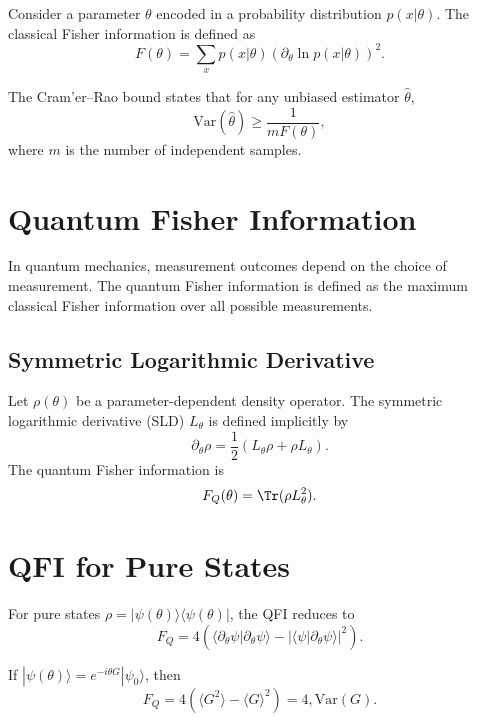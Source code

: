 \documentclass{book}
\begin{document}
Consider a parameter $\theta$ encoded in a probability distribution $p(x|\theta)$. The classical Fisher information is defined as
\begin{equation}
F(\theta) = \sum_x p(x|\theta) \left( \partial_\theta \ln p(x|\theta) \right)^2.
\end{equation}

The Cram'er–Rao bound states that for any unbiased estimator $\hat{\theta}$,
\begin{equation}
\mathrm{Var}(\hat{\theta}) \ge \frac{1}{m F(\theta)},
\end{equation}
where $m$ is the number of independent samples.

\section{Quantum Fisher Information}

In quantum mechanics, measurement outcomes depend on the choice of measurement. The quantum Fisher information is defined as the maximum classical Fisher information over all possible measurements.

\subsection{Symmetric Logarithmic Derivative}

Let $\rho(\theta)$ be a parameter-dependent density operator. The symmetric logarithmic derivative (SLD) $L_\theta$ is defined implicitly by
\begin{equation}
\partial_\theta \rho = \frac{1}{2}(L_\theta \rho + \rho L_\theta).
\end{equation}
The quantum Fisher information is
\begin{equation}
F_Q(\theta) = \Tr(\rho L_\theta^2).
\end{equation}

\section{QFI for Pure States}

For pure states $\rho = |\psi(\theta)\rangle\langle\psi(\theta)|$, the QFI reduces to
\begin{equation}
F_Q = 4 \left( \langle \partial_\theta \psi | \partial_\theta \psi \rangle - |\langle \psi | \partial_\theta \psi \rangle|^2 \right).
\end{equation}

If $|\psi(\theta)\rangle = e^{-i \theta G} |\psi_0\rangle$, then
\begin{equation}
F_Q = 4 ( \langle G^2 \rangle - \langle G \rangle^2 ) = 4 , \mathrm{Var}(G).
\end{equation}
\end{document}
